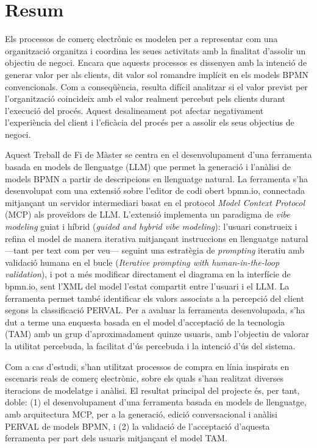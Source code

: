 \newpage

\chapter*{Resum}

Els processos de comerç electrònic es modelen per a representar com una organització organitza i coordina les seues activitats amb la finalitat d'assolir un objectiu de negoci. Encara que aquests processos es dissenyen amb la intenció de generar valor per als clients, dit valor sol romandre implícit en els models BPMN convencionals. Com a conseqüència, resulta difícil analitzar si el valor previst per l'organització coincideix amb el valor realment percebut pels clients durant l'execució del procés. Aquest desalineament pot afectar negativament l'experiència del client i l'eficàcia del procés per a assolir els seus objectius de negoci.

Aquest Treball de Fi de Màster se centra en el desenvolupament d'una ferramenta basada en models de llenguatge (LLM) que permet la generació i l'anàlisi de models BPMN a partir de descripcions en llenguatge natural. La ferramenta s'ha desenvolupat com una extensió sobre l'editor de codi obert bpmn.io, connectada mitjançant un servidor intermediari basat en el protocol \textit{Model Context Protocol} (MCP) als proveïdors de LLM. L'extensió implementa un paradigma de \textit{vibe modeling} guiat i híbrid (\textit{guided and hybrid vibe modeling}): l'usuari construeix i refina el model de manera iterativa mitjançant instruccions en llenguatge natural ---tant per text com per veu--- seguint una estratègia de \textit{prompting} iteratiu amb validació humana en el bucle (\textit{Iterative prompting with human-in-the-loop validation}), i pot a més modificar directament el diagrama en la interfície de bpmn.io, sent l'XML del model l'estat compartit entre l'usuari i el LLM. La ferramenta permet també identificar els valors associats a la percepció del client segons la classificació PERVAL. Per a avaluar la ferramenta desenvolupada, s'ha dut a terme una enquesta basada en el model d'acceptació de la tecnologia (TAM) amb un grup d'aproximadament quinze usuaris, amb l'objectiu de valorar la utilitat percebuda, la facilitat d'ús percebuda i la intenció d'ús del sistema.

Com a cas d'estudi, s'han utilitzat processos de compra en línia inspirats en escenaris reals de comerç electrònic, sobre els quals s'han realitzat diverses iteracions de modelatge i anàlisi. El resultat principal del projecte és, per tant, doble: (1) el desenvolupament d'una ferramenta basada en models de llenguatge, amb arquitectura MCP, per a la generació, edició conversacional i anàlisi PERVAL de models BPMN, i (2) la validació de l'acceptació d'aquesta ferramenta per part dels usuaris mitjançant el model TAM.


